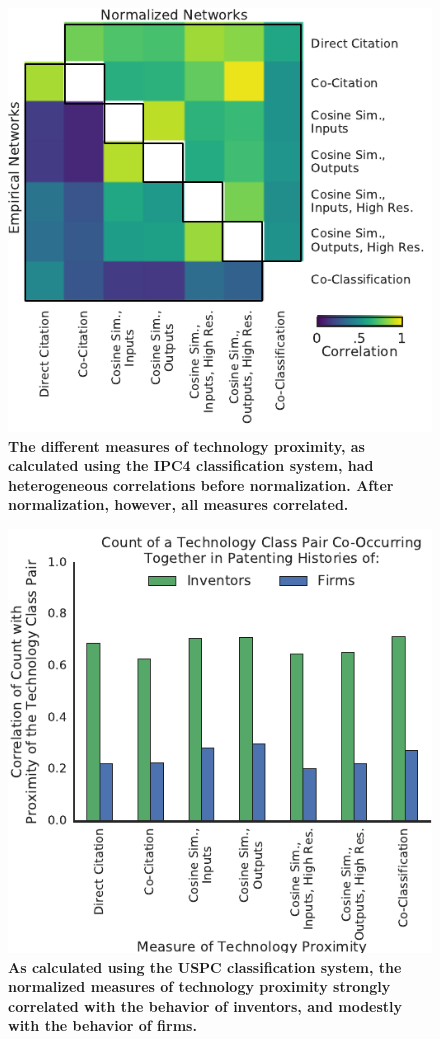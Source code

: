 \documentclass[]{svjour3}
\begin{document}
\begin{figure}[p!]
\centering
\includegraphics[width=.7\textwidth]{figs/Network_Correlations_Linear_IPC4.pdf} 
\caption{\textbf{The different measures of technology proximity, as calculated using the IPC4 classification system, had heterogeneous correlations before normalization. After normalization, however, all measures correlated.}}\label{Network_Correlations_Linear_IPC4}
\end{figure}

\begin{figure}[p!]
\centering
\includegraphics[width=.7\textwidth]{figs/Relatedness_Behavior_Correlation_USPC.pdf} 
\caption{\textbf{As calculated using the USPC classification system, the normalized measures of technology proximity strongly correlated with the behavior of inventors, and modestly with the behavior of firms.}}
\end{figure}
\end{document}
